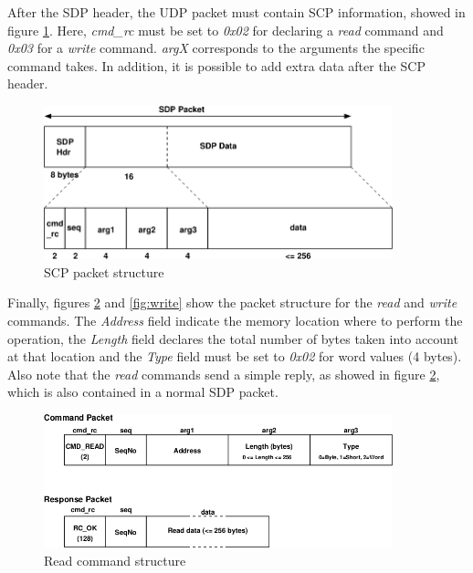 \documentclass{article}
\begin{document}
After the SDP header, the UDP packet must contain SCP information, showed in figure \ref{fig:scp}. Here, \textit{cmd\_rc} must be set to \textit{0x02} for declaring a \textit{read} command and \textit{0x03} for a \textit{write} command. \textit{argX} corresponds to the arguments the specific command takes. In addition, it is possible to add extra data after the SCP header.
\begin{figure}[h]
\begin{center}
\includegraphics[width=0.9\textwidth]{scp}
\caption{SCP packet structure}
\label{fig:scp}
\end{center}
\end{figure}

Finally, figures \ref{fig:read} and \ref{fig:write} show the packet structure for the \textit{read} and \textit{write} commands. The \textit{Address} field indicate the memory location where to perform the operation, the \textit{Length} field declares the total number of bytes taken into account at that location and the \textit{Type} field must be set to \textit{0x02} for word values (4 bytes). Also note that the \textit{read} commands send a simple reply, as showed in figure \ref{fig:read}, which is also contained in a normal SDP packet.
\begin{figure}[h]
\begin{center}
\includegraphics[width=0.9\textwidth]{read}
\caption{Read command structure}
\label{fig:read}
\end{center}
\end{figure}
\end{document}
